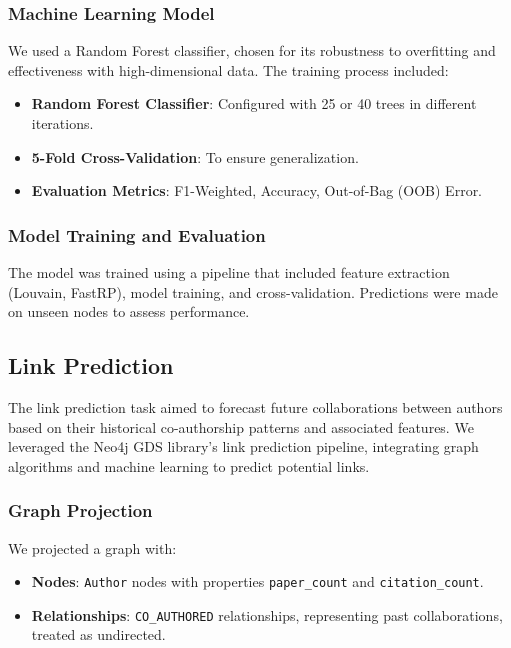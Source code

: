 \documentclass[conference, 12pt]{IEEEtran}
\begin{document}
\subsubsection{Machine Learning Model}
We used a Random Forest classifier, chosen for its robustness to overfitting and effectiveness with high-dimensional data. The training process included:
\begin{itemize}
  \item \textbf{Random Forest Classifier}: Configured with 25 or 40 trees in different iterations.
  \item \textbf{5-Fold Cross-Validation}: To ensure generalization.
  \item \textbf{Evaluation Metrics}: F1-Weighted, Accuracy, Out-of-Bag (OOB) Error.
\end{itemize}

\subsubsection{Model Training and Evaluation}
The model was trained using a pipeline that included feature extraction (Louvain, FastRP), model training, and cross-validation. Predictions were made on unseen nodes to assess performance.

\subsection{Link Prediction}
The link prediction task aimed to forecast future collaborations between authors based on their historical co-authorship patterns and associated features. We leveraged the Neo4j GDS library's link prediction pipeline, integrating graph algorithms and machine learning to predict potential links.

\subsubsection{Graph Projection}
We projected a graph with:
\begin{itemize}
  \item \textbf{Nodes}: \texttt{Author} nodes with properties \texttt{paper\_count} and \texttt{citation\_count}.
  \item \textbf{Relationships}: \texttt{CO\_AUTHORED} relationships, representing past collaborations, treated as undirected.
\end{itemize}
\end{document}
